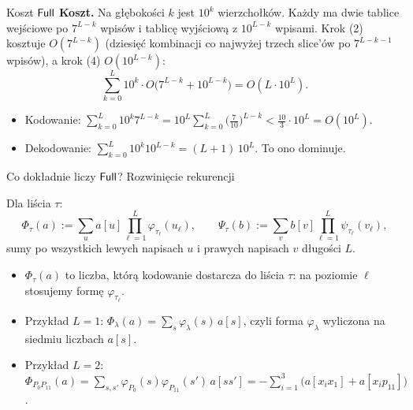 \begin{frame}{Koszt $\mathsf{Full}$}
  \textbf{Koszt.} Na głębokości $k$ jest $10^k$ wierzchołków. Każdy ma dwie tablice wejściowe po $7^{L-k}$
  wpisów i tablicę wyjściową z $10^{L-k}$ wpisami. Krok (2) kosztuje $O(7^{L-k})$ (dziesięć kombinacji co najwyżej
  trzech slice'ów po $7^{L-k-1}$ wpisów), a krok (4) $O(10^{L-k})$:
  \pause
  \[
    \sum_{k=0}^{L}10^k\cdot O\big(7^{L-k}+10^{L-k}\big)=O(L\cdot10^L).
  \]
  \pause
  \begin{itemize}
    \item Kodowanie: $\displaystyle\sum_{k=0}^{L}10^k7^{L-k}=10^L\sum_{k=0}^{L}\big(\tfrac{7}{10}\big)^{L-k}
      <\tfrac{10}{3}\cdot10^L=O(10^L)$.
    \item Dekodowanie: $\displaystyle\sum_{k=0}^{L}10^k10^{L-k}=(L+1)\,10^L$. To ono dominuje.
  \end{itemize}
\end{frame}

\begin{frame}{Co dokładnie liczy $\mathsf{Full}$? Rozwinięcie rekurencji}
  \begin{definicja}
    Dla liścia $\tau$:
    \[
      \Phi_\tau(a):=\sum_u a[u]\prod_{\ell=1}^{L}\varphi_{\tau_\ell}(u_\ell),\qquad
      \Psi_\tau(b):=\sum_v b[v]\prod_{\ell=1}^{L}\psi_{\tau_\ell}(v_\ell),
    \]
    sumy po wszystkich lewych napisach $u$ i prawych napisach $v$ długości $L$.
  \end{definicja}
  \pause
  \begin{itemize}
    \item $\Phi_\tau(a)$ to liczba, którą kodowanie dostarcza do liścia $\tau$: na poziomie $\ell$ stosujemy formę $\varphi_{\tau_\ell}$.
    \item Przykład $L=1$: $\Phi_\lambda(a)=\sum_s\varphi_\lambda(s)\,a[s]$, czyli forma $\varphi_\lambda$ wyliczona na siedmiu liczbach $a[s]$.
    \item Przykład $L=2$: $\Phi_{P_0P_{11}}(a)=\sum_{s,s'}\varphi_{P_0}(s)\varphi_{P_{11}}(s')\,a[ss']
      =-\sum_{i=1}^{3}\big(a[x_ix_1]+a[x_ip_{11}]\big)$.
  \end{itemize}
\end{frame}

